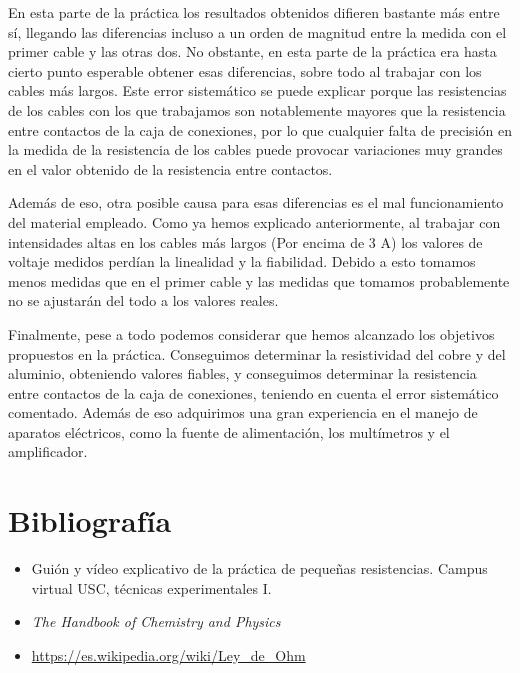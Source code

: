 \documentclass[a4paper,12pt,titlepage]{article}
\begin{document}
En esta parte de la práctica los resultados obtenidos difieren bastante más entre sí, llegando las diferencias incluso a un orden de magnitud entre la medida con el primer cable y las otras dos. No obstante, en esta parte de la práctica era hasta cierto punto esperable obtener esas diferencias, sobre todo al trabajar con los cables más largos. Este error sistemático se puede explicar porque las resistencias de los cables con los que trabajamos son notablemente mayores que la resistencia entre contactos de la caja de conexiones, por lo que cualquier falta de precisión en la medida de la resistencia de los cables puede provocar variaciones muy grandes en el valor obtenido de la resistencia entre contactos.

\par Además de eso, otra posible causa para esas diferencias es el mal funcionamiento del material empleado. Como ya hemos explicado anteriormente, al trabajar con intensidades altas en los cables más largos (Por encima de 3 A) los valores de voltaje medidos perdían la linealidad y la fiabilidad. Debido a esto tomamos menos medidas que en el primer cable y las medidas que tomamos probablemente no se ajustarán del todo a los valores reales.

\par Finalmente, pese a todo podemos considerar que hemos alcanzado los objetivos propuestos en la práctica. Conseguimos determinar la resistividad del cobre y del aluminio, obteniendo valores fiables, y conseguimos determinar la resistencia entre contactos de la caja de conexiones, teniendo en cuenta el error sistemático comentado. Además de eso adquirimos una gran experiencia en el manejo de aparatos eléctricos, como la fuente de alimentación, los multímetros y el amplificador.

\section{Bibliografía}

\begin{itemize}
    \item Guión y vídeo explicativo de la práctica de pequeñas resistencias. Campus virtual USC, técnicas experimentales I.
    \item \textit{The Handbook of Chemistry and Physics}
    \item \url{https://es.wikipedia.org/wiki/Ley_de_Ohm}
\end{itemize}
\end{document}
